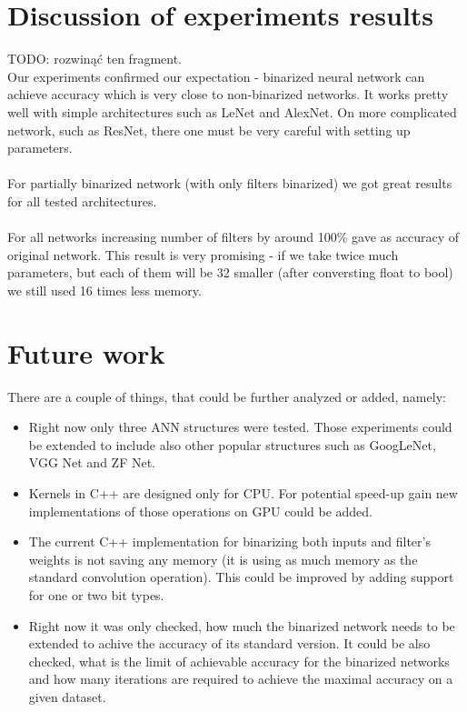 \documentclass[licencjacka]{pracamgr}
\begin{document}
	\section{Discussion of experiments results}
		TODO: rozwinąć ten fragment. \\
		Our experiments confirmed our expectation - binarized neural network can achieve accuracy which is very close to non-binarized networks. It works pretty well with simple architectures such as LeNet and AlexNet. On more complicated network, such as ResNet, there one must be very careful with setting up parameters. 
		\\\\
		For partially binarized network (with only filters binarized) we got great results for all tested architectures.
		\\\\
		For all networks increasing number of filters by around 100\% gave as accuracy of original network. This result is very promising - if we take twice much parameters, but each of them will be 32 smaller (after conversting float to bool) we still used 16 times less memory.

	\section{Future work}
		There are a couple of things, that could be further analyzed or added, namely:
		\begin{itemize}
			\item Right now only three ANN structures were tested. Those experiments could be extended to include also other popular structures such as GoogLeNet, VGG Net and ZF Net.
			\item Kernels in C++ are designed only for CPU. For potential speed-up gain new implementations of those operations on GPU could be added. 
			\item The current C++ implementation for binarizing both inputs and filter's weights is not saving any memory (it is using as much memory as the standard convolution operation). This could be improved by adding support for one or two bit types. 
			\item Right now it was only checked, how much the binarized network needs to be extended to achive the accuracy of its standard version. It could be also checked, what is the limit of achievable accuracy for the binarized networks and how many iterations are required to achieve the maximal accuracy on a given dataset.
		\end{itemize} 
\end{document}
